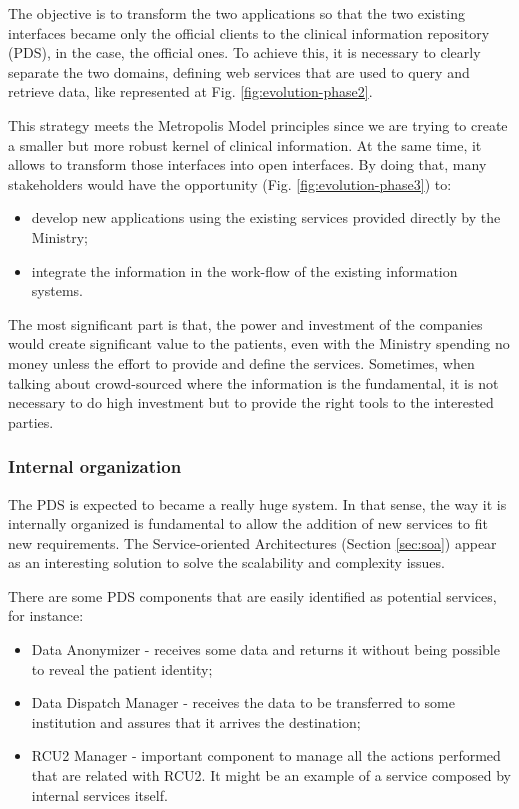 The objective is to transform the two applications so that the two existing interfaces became only the official clients to the clinical information repository (PDS), in the case, the official ones. To achieve this, it is necessary to clearly separate the two domains, defining web services that are used to query and retrieve data, like represented at Fig. \ref{fig:evolution-phase2}.


This strategy meets the Metropolis Model principles since we are trying to create a smaller but more robust kernel of clinical information. At the same time, it allows to transform those interfaces into open interfaces. By doing that, many stakeholders would have the opportunity (Fig. \ref{fig:evolution-phase3}) to: 
\begin{itemize}
\item develop new applications using the existing services provided directly by the Ministry;
\item integrate the information in the work-flow of the existing information systems.
\end{itemize}

The most significant part is that, the power and investment of the companies would create significant value to the patients, even with the Ministry spending no money unless the effort to provide and define the services. Sometimes, when talking about crowd-sourced where the information is the fundamental, it is not necessary to do high investment but to provide the right tools to the interested parties.


\subsubsection{Internal organization}

The PDS is expected to became a really huge system. In that sense, the way it is internally organized is fundamental to allow the addition of new services to fit new requirements. The Service-oriented Architectures (Section \ref{sec:soa}) appear as an interesting solution to solve the scalability and complexity issues.

There are some PDS components that are easily identified as potential services, for instance:
\begin{itemize}
\item Data Anonymizer - receives some data and returns it without being possible to reveal the patient identity;
\item Data Dispatch Manager - receives the data to be transferred to some institution and assures that it arrives the destination;
\item RCU2 Manager - important component to manage all the actions performed that are related with RCU2. It might be an example of a service composed by internal services itself.
\end{itemize}


